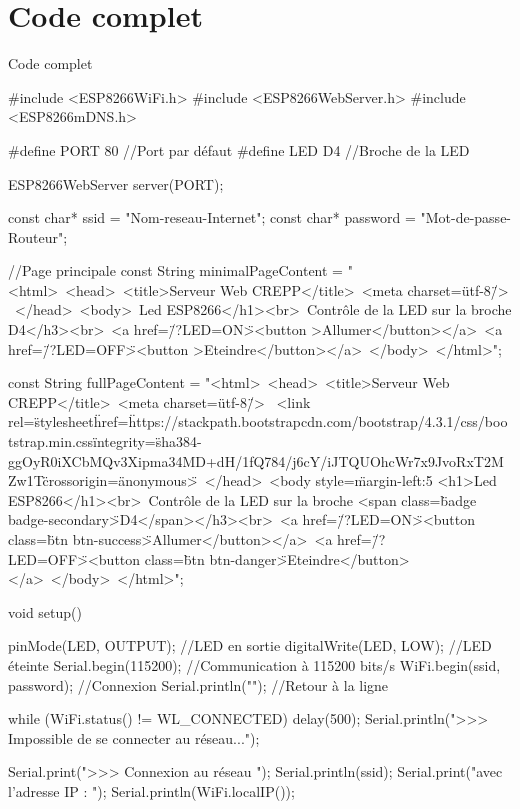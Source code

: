\section{Code complet}
\begin{Cpp}{Code complet}

#include <ESP8266WiFi.h>
#include <ESP8266WebServer.h>
#include <ESP8266mDNS.h>
    
#define PORT 80 //Port par défaut
#define LED D4  //Broche de la LED
    
ESP8266WebServer server(PORT);
    
const char* ssid     = "Nom-reseau-Internet";
const char* password = "Mot-de-passe-Routeur";
    
//Page principale
const String minimalPageContent = "<html>\
<head>\
    <title>Serveur Web CREPP</title>\
    <meta charset=\"utf-8\"/> \
    </head>\
    <body>\
    <h1>Led ESP8266</h1><br>\
        <h3>Contrôle de la LED sur la broche D4</h3><br>\
          <a href=\"/?LED=ON\"><button >Allumer</button></a>\
          <a href=\"/?LED=OFF\"><button >Eteindre</button></a>\
      </body>\
    </html>";
    
    const String fullPageContent = "<html>\
      <head>\
        <title>Serveur Web CREPP</title>\
        <meta charset=\"utf-8\"/> \
        <link rel=\"stylesheet\" href=\"https://stackpath.bootstrapcdn.com/bootstrap/4.3.1/css/bootstrap.min.css\" integrity=\"sha384-ggOyR0iXCbMQv3Xipma34MD+dH/1fQ784/j6cY/iJTQUOhcWr7x9JvoRxT2MZw1T\" crossorigin=\"anonymous\">\
      </head>\
      <body style=\"margin-left:5%
        <h1>Led ESP8266</h1><br>\
        <h3>Contrôle de la LED sur la broche <span class=\"badge badge-secondary\">D4</span></h3><br>\
          <a href=\"/?LED=ON\"><button class=\"btn btn-success\">Allumer</button></a>\
          <a href=\"/?LED=OFF\"><button class=\"btn btn-danger\">Eteindre</button></a>\
      </body>\
    </html>";
    
    
void setup() {
      
    pinMode(LED, OUTPUT);       //LED en sortie
    digitalWrite(LED, LOW);     //LED éteinte
    Serial.begin(115200);       //Communication à 115200 bits/s
    WiFi.begin(ssid, password); //Connexion
    Serial.println("");         //Retour à la ligne
    
      
    while (WiFi.status() != WL_CONNECTED) 
    {
        delay(500);
        Serial.println(">>> Impossible de se connecter au réseau...");
    }
      
    Serial.print(">>> Connexion au réseau ");
    Serial.println(ssid);
    Serial.print("avec l'adresse IP : ");
    Serial.println(WiFi.localIP());
    
}
\end{Cpp}
